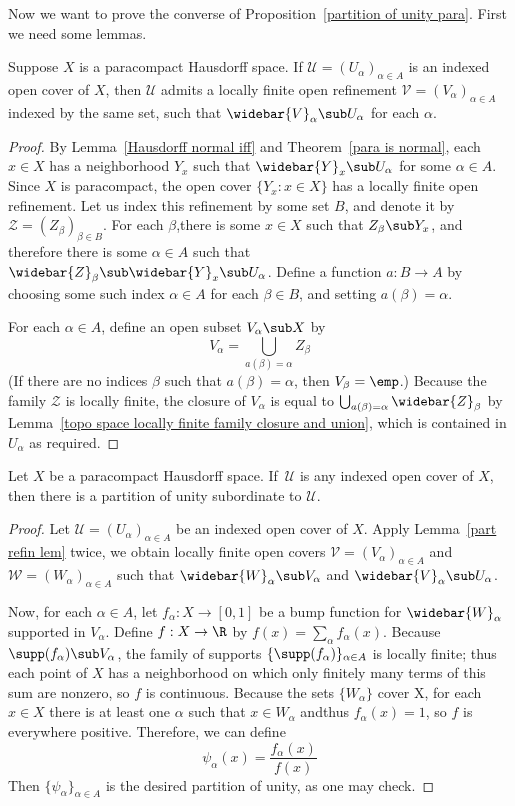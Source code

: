 Now we want to prove the converse of Proposition~\ref{partition of unity para}. First we need some lemmas.
\begin{lemma}\label{part refin lem}
Suppose $X$ is a paracompact Hausdorff space. If $\mathcal{U}=(U_\alpha)_{\alpha\in A}$ is an indexed open cover of $X$, then $\mathcal{U}$ admits a locally finite open refinement $\mathcal{V}=(V_\alpha)_{\alpha\in A}$ indexed by the same set, such that $\widebar{V}_\alpha\sub U_\alpha$ for each $\alpha$.
\end{lemma}
\begin{proof}
By Lemma~\ref{Hausdorff normal iff} and Theorem~\ref{para is normal}, each $x\in X$ has a neighborhood $Y_x$ such that $\widebar{Y}_x\sub U_\alpha$ for some $\alpha\in A$. Since $X$ is paracompact, the open cover $\{Y_x:x\in X\}$ has a locally finite open refinement. Let us index this refinement by some set $B$, and denote it by $\mathcal{Z}=(Z_\beta)_{\beta\in B}$. For each $\beta$,there is some $x\in X$ such that $Z_\beta\sub Y_x$, and therefore there is some $\alpha\in A$ such that
$\widebar{Z}_\beta\sub \widebar{Y}_x\sub U_\alpha$. Define a function $a:B\to A$ by choosing some such index $\alpha\in A$ for each $\beta\in B$, and setting $a(\beta)=\alpha$.\par
For each $\alpha\in A$, define an open subset $V_\alpha\sub X$ by
\[V_\alpha=\bigcup_{a(\beta)=\alpha}Z_\beta\]
(If there are no indices $\beta$ such that $a(\beta)=\alpha$, then $V_\beta=\emp$.) Because the family $\mathcal{Z}$ is locally finite, the closure of $V_\alpha$ is equal to $\bigcup_{a(\beta)=\alpha}\widebar{Z}_{\beta}$ by Lemma~\ref{topo space locally finite family closure and union}, which is contained in $U_\alpha$ as required.
\end{proof}
\begin{theorem}\label{partition of unity}
Let $X$ be a paracompact Hausdorff space. If $\,\mathcal{U}$ is any indexed open cover of $X$, then there is a partition of unity subordinate to $\mathcal{U}$.
\end{theorem}
\begin{proof}
Let $\mathcal{U}=(U_\alpha)_{\alpha\in A}$ be an indexed open cover of $X$. Apply Lemma~\ref{part refin lem} twice, we obtain locally finite open covers $\mathcal{V}=(V_\alpha)_{\alpha\in A}$ and $\mathcal{W}=(W_\alpha)_{\alpha\in A}$ such that $\widebar{W}_\alpha\sub V_\alpha$ and $\widebar{V}_\alpha\sub U_\alpha$.\par
Now, for each $\alpha\in A$, let $f_\alpha:X\to[0,1]$ be a bump function for $\widebar{W}_\alpha$ supported in $V_\alpha$. Define $f:X\to\R$ by $f(x)=\sum_\alpha f_\alpha(x)$. Because $\supp(f_\alpha)\sub V_\alpha$, the family of supports $\{\supp(f_\alpha)\}_{\alpha\in A}$ is locally finite; thus each point of $X$ has a neighborhood on which only finitely many terms of this sum are nonzero, so $f$ is continuous. Because
the sets $\{W_\alpha\}$ cover X, for each $x\in X$ there is at least one $\alpha$ such that $x\in W_\alpha$ andthus $f_\alpha(x)=1$, so $f$ is everywhere positive. Therefore, we can define 
\[\psi_\alpha(x)=\dfrac{f_\alpha(x)}{f(x)}\]
Then $\{\psi_\alpha\}_{\alpha\in A}$ is the desired partition of unity, as one may check.
\end{proof}
